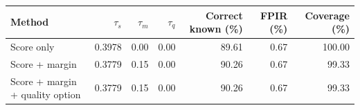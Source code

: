 \begin{tabular}{lrrrrrr}
\hline
Method & $\tau_s$ & $\tau_m$ & $\tau_q$ & Correct known (\%) & FPIR (\%) & Coverage (\%) \\
\hline
Score only & 0.3978 & 0.00 & 0.00 & 89.61 & 0.67 & 100.00 \\
Score + margin & 0.3779 & 0.15 & 0.00 & 90.26 & 0.67 & 99.33 \\
Score + margin + quality option & 0.3779 & 0.15 & 0.00 & 90.26 & 0.67 & 99.33 \\
\hline
\end{tabular}

